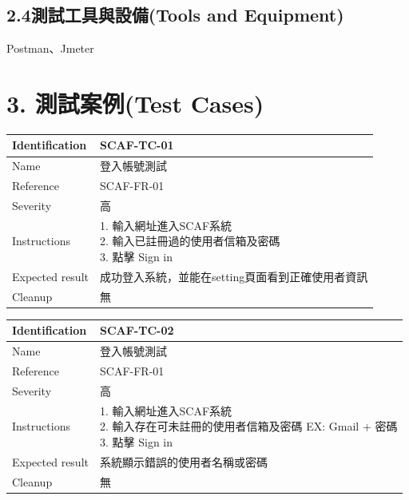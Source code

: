 \documentclass{report}
\begin{document}
\subsection*{2.4測試工具與設備(Tools and Equipment)}
Postman、Jmeter

\section*{3. 測試案例(Test Cases)}
\begin{tabularx}{\textwidth}{
  |p{}%
  |p{}|%
  }
  \hline
  \centering Identification &  SCAF-TC-01 \\
  \hline
  \centering Name & 登入帳號測試 \\
  \hline
  \centering Reference & SCAF-FR-01 \\
  \hline
  \centering Severity & 高 \\
  \hline
  \centering Instructions & 
  \makecell[l]{
    1. 輸入網址進入SCAF系統 \\
    2. 輸入已註冊過的使用者信箱及密碼 \\
    3. 點擊 Sign in
  }\\
  \hline
  \centering Expected result & 成功登入系統，並能在setting頁面看到正確使用者資訊 \\
  \hline
  \centering Cleanup & 無 \\
  \hline
\end{tabularx}
\newline\newline
\begin{tabularx}{\textwidth}{
  |p{}%
  |p{}|%
  }
  \hline
  \centering Identification &  SCAF-TC-02 \\
  \hline
  \centering Name & 登入帳號測試 \\
  \hline
  \centering Reference & SCAF-FR-01 \\
  \hline
  \centering Severity & 高 \\
  \hline
  \centering Instructions & 
  \makecell[l]{
    1. 輸入網址進入SCAF系統 \\
    2. 輸入存在可未註冊的使用者信箱及密碼 EX: Gmail + 密碼 \\
    3. 點擊 Sign in
  }\\
  \hline
  \centering Expected result & 系統顯示錯誤的使用者名稱或密碼 \\
  \hline
  \centering Cleanup & 無 \\
  \hline
\end{tabularx}
\end{document}
